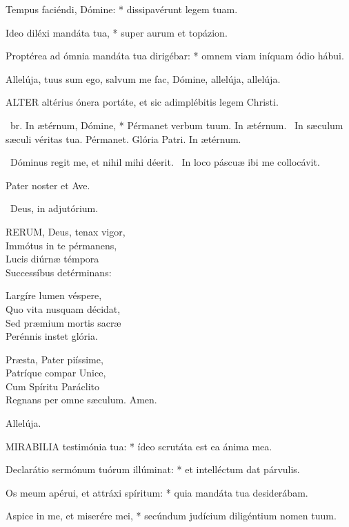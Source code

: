 Tempus faciéndi, Dómine: * dissipavérunt legem tuam.

Ideo diléxi mandáta tua, * super aurum et topázion.

Proptérea ad ómnia mandáta tua dirigébar: * omnem viam iníquam ódio hábui.

 Allelúja, tuus sum ego, salvum me fac, Dómine, allelúja, allelúja.


\lettrine[lines=2]{A}{LTER} altérius ónera portáte, et sic adimplébitis legem Christi.

\R\ br. In ætérnum, Dómine, * Pérmanet verbum tuum. In ætérnum. \V\ In sæculum sæculi véritas tua. Pérmanet. Glória Patri. In ætérnum.

\V\ Dóminus regit me, et nihil mihi déerit. \R\ In loco páscuæ ibi me collocávit.



Pater noster et Ave.

\V\ Deus, in adjutórium.


\lettrine[lines=2]{R}{ERUM}, Deus, tenax vigor,\\
Immótus in te pérmanens,\\
Lucis diúrnæ témpora\\
Successíbus detérminans:

Largíre lumen véspere,\\
Quo vita nusquam décidat,\\
Sed præmium mortis sacræ\\
Perénnis instet glória.

Præsta, Pater piíssime,\\
Patríque compar Unice,\\
Cum Spíritu Paráclito\\
Regnans per omne sæculum. Amen.

 Allelúja.


\lettrine[lines=2]{M}{IRABILIA} testimónia tua: * ídeo scrutáta est ea ánima mea.

Declarátio sermónum tuórum illúminat: * et intelléctum dat párvulis.

Os meum apérui, et attráxi spíritum: * quia mandáta tua desiderábam.

Aspice in me, et miserére mei, * secúndum judícium diligéntium nomen tuum.

